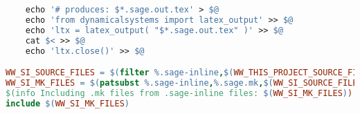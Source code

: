 \begin{lstlisting}[language=make]
%.sage.step : %.sage-inline sage-inline.mk
	echo '# produces: $*.sage.out.tex' > $@
	echo 'from dynamicalsystems import latex_output' >> $@
	echo 'ltx = latex_output( "$*.sage.out.tex" )' >> $@
	cat $< >> $@
	echo 'ltx.close()' >> $@

WW_SI_SOURCE_FILES = $(filter %.sage-inline,$(WW_THIS_PROJECT_SOURCE_FILES))
WW_SI_MK_FILES = $(patsubst %.sage-inline,%.sage.mk,$(WW_SI_SOURCE_FILES))
$(info Including .mk files from .sage-inline files: $(WW_SI_MK_FILES))
include $(WW_SI_MK_FILES)
\end{lstlisting}
